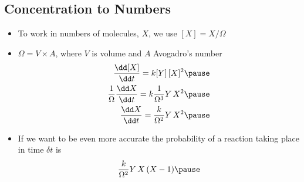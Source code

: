 
\begin{slide}
\section[-2]{Concentration to Numbers}

\begin{PauseHighLight}
  \begin{itemize}
  \item To work in numbers of molecules, $X$, we use $[X] =
    X/\Omega$\pause
  \item $\Omega = V \times A$, where $V$ is volume and $A$ Avogadro's
    number
    \begin{align*}
      \frac{\dd [X]}{\dd t} = k [Y]\,[X]^2\pause\\
      \frac{1}{\Omega} \frac{\dd X}{\dd t} = k \frac{1}{\Omega^3}
      Y\,X^2\pause\\
      \frac{\dd X}{\dd t} = \frac{k}{\Omega^2} Y\,X^2\pause
    \end{align*}
  \item If we want to be even more accurate the probability of a
    reaction taking place in time $\delta t$ is
    \begin{align*}
      \frac{k}{\Omega^2} Y\,X\,(X-1)\pause
    \end{align*}
  \end{itemize}
\end{PauseHighLight}

\end{slide}



\Outline %


